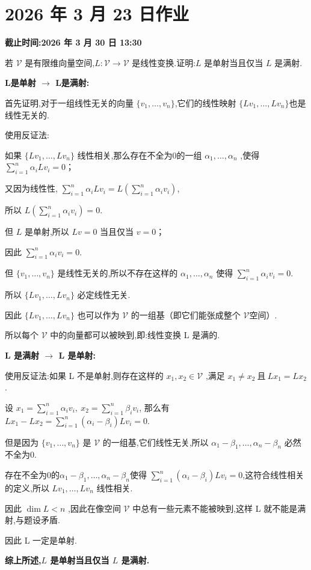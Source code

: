 \section*{2026 年 3 月 23 日作业}
{}
\noindent\textbf{截止时间:2026 年 3 月 30 日 13:30}
\setcounter{problem}{0}
\setcounter{sollemma}{0}

\begin{problem}
若 $\mathcal V$ 是有限维向量空间,$L: \mathcal V \to \mathcal V$ 是线性变换.证明:$L$ 是单射当且仅当 $L$ 是满射.
    \begin{solution}
        \textbf{L是单射 $\to$ L是满射:}

        首先证明,对于一组线性无关的向量 $\{v_1,\ldots,v_n\}$,它们的线性映射 $\{Lv_1,\ldots,Lv_n\}$也是线性无关的.
        
        使用反证法:

        如果 $\{Lv_1,\ldots,Lv_n\}$ 线性相关,那么存在不全为0的一组 $\alpha_1,\ldots,\alpha_n$ ,使得 $\sum_{i = 1}^{n} \alpha_i Lv_i = 0$；
        
        又因为线性性, $\sum_{i = 1}^{n} \alpha_i Lv_i = L \left( \sum_{i = 1}^{n}\alpha_i v_i \right)$,

        所以 $L \left( \sum_{i = 1}^{n}\alpha_i v_i \right) = 0$.
        
        但 $L$ 是单射,所以 $Lv = 0$ 当且仅当 $v = 0$；

        因此 $\sum_{i = 1}^{n}\alpha_i v_i = 0$.

        但 $\{v_1,\ldots,v_n\}$ 是线性无关的,所以不存在这样的 $\alpha_1,\ldots,\alpha_n$ 使得 $\sum_{i = 1}^{n}\alpha_i v_i = 0$.

        所以 $\{Lv_1,\ldots,Lv_n\}$ 必定线性无关.

        因此 $\{Lv_1,\ldots,Lv_n\}$ 也可以作为 $\mathcal{V}$ 的一组基（即它们能张成整个 $\mathcal{V}$空间）.

        所以每个 $\mathcal{V}$ 中的向量都可以被映到,即:线性变换 L 是满的.

        \textbf{L 是满射 $\to$ L 是单射:}

        使用反证法:如果 L 不是单射,则存在这样的 $x_1,x_2 \in \mathcal{V}$ ,满足 $x_1 \ne x_2 \ \text{且} \ Lx_1 = Lx_2$.

        设 $x_1 = \sum_{i = 1}^{n} \alpha_i v_i , \  x_2 = \sum_{i = 1}^{n} \beta_i v_i$,
        那么有 $Lx_1 - Lx_2 = \sum_{i = 1}^{n} (\alpha_i - \beta_i)Lv_i = 0$.

        但是因为 $\{v_1,\ldots,v_n\}$ 是 $\mathcal{V}$ 的一组基,它们线性无关,所以 $\alpha_1 - \beta_1,\ldots,\alpha_n - \beta_n$ 必然不全为0.

        存在不全为0的$\alpha_1 - \beta_1,\ldots,\alpha_n - \beta_n$使得 $\sum_{i = 1}^{n} (\alpha_i - \beta_i)Lv_i = 0$,这符合线性相关的定义,所以 $Lv_1,\ldots,Lv_n$ 线性相关.

        因此 $\dim L < n$ ,因此在像空间 $\mathcal{V}$ 中总有一些元素不能被映到,这样 L 就不能是满射,与题设矛盾.

        因此 L 一定是单射.

        \textbf{综上所述,$L$ 是单射当且仅当 $L$ 是满射.}
    \end{solution}
\end{problem}

